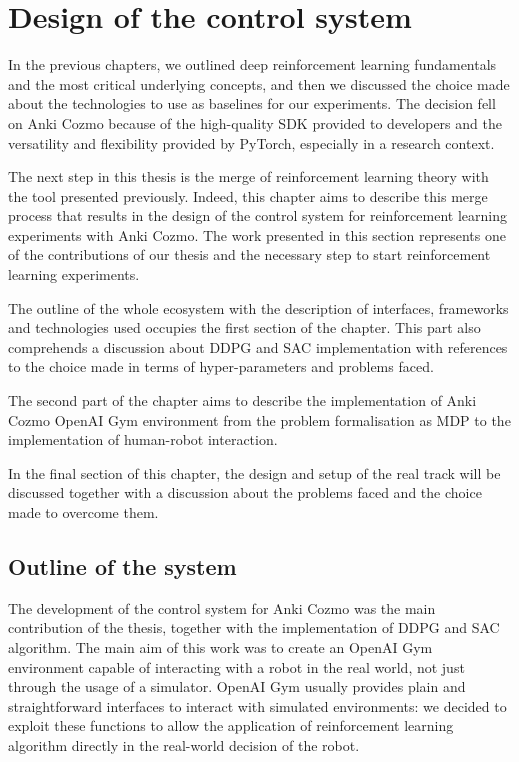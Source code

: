 \chapter{Design of the control system} \label{ch4}

In the previous chapters, we outlined deep reinforcement learning fundamentals and the most critical underlying concepts, and then we discussed the choice made about the technologies to use as baselines for our experiments. The decision fell on Anki Cozmo because of the high-quality SDK provided to developers and the versatility and flexibility provided by PyTorch, especially in a research context.

The next step in this thesis is the merge of reinforcement learning theory with the tool presented previously. Indeed, this chapter aims to describe this merge process that results in the design of the control system for reinforcement learning experiments with Anki Cozmo. The work presented in this section represents one of the contributions of our thesis and the necessary step to start reinforcement learning experiments.

The outline of the whole ecosystem with the description of interfaces, frameworks and technologies used occupies the first section of the chapter. This part also comprehends a discussion about DDPG \cite{lillicrap2015continuous} and SAC \cite{haarnoja2018soft, haarnoja2018alg} implementation with references to the choice made in terms of hyper-parameters and problems faced.

The second part of the chapter aims to describe the implementation of Anki Cozmo OpenAI Gym environment from the problem formalisation as MDP to the implementation of human-robot interaction.

In the final section of this chapter, the design and setup of the real track will be discussed together with a discussion about the problems faced and the choice made to overcome them.

\section{Outline of the system}

The development of the control system for Anki Cozmo was the main contribution of the thesis, together with the implementation of DDPG and SAC algorithm. The main aim of this work was to create an OpenAI Gym environment capable of interacting with a robot in the real world, not just through the usage of a simulator. OpenAI Gym usually provides plain and straightforward interfaces to interact with simulated environments: we decided to exploit these functions to allow the application of reinforcement learning algorithm directly in the real-world decision of the robot.

